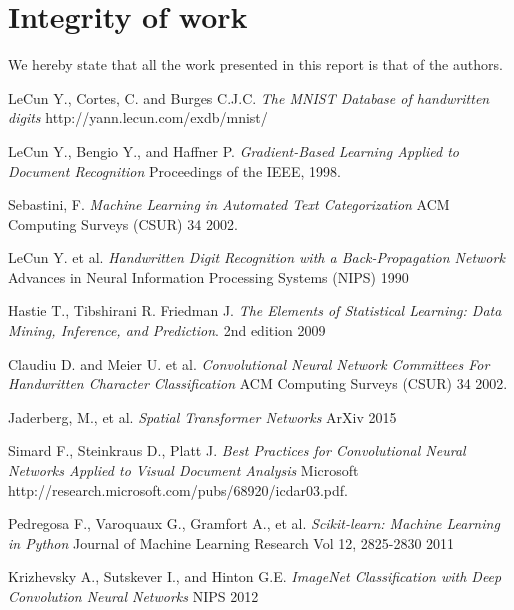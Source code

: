 \documentclass[conference]{IEEEtran}
\begin{document}
\section{Integrity of work}
We hereby state that all the work presented in this report is that of the authors.
\begin{thebibliography}{9}

LeCun Y., Cortes, C. and Burges C.J.C.
	\emph{The MNIST Database of handwritten digits}
	http://yann.lecun.com/exdb/mnist/


LeCun Y., Bengio Y., and Haffner P.
 \emph{Gradient-Based Learning Applied to Document Recognition}
 Proceedings of the IEEE,
 1998.

 
 Sebastini, F.
  \emph{Machine Learning in Automated Text Categorization}
  ACM Computing Surveys (CSUR) 34
  2002.

  LeCun Y. et al.
  \emph{Handwritten Digit Recognition with a Back-Propagation Network}
    Advances in Neural Information Processing Systems (NIPS)
    1990

 Hastie T., Tibshirani R. Friedman J.
 \emph{The Elements of 
Statistical Learning: Data Mining, Inference, and Prediction}.
2nd edition
2009


 Claudiu D. and Meier U. et al.
  \emph{Convolutional Neural Network Committees For Handwritten Character
Classification}
  ACM Computing Surveys (CSUR) 34
  2002.

 Jaderberg, M., et al.
  \emph{Spatial Transformer Networks}
  ArXiv
  2015
  
  Simard F., Steinkraus D., Platt J.
  \emph{Best Practices for Convolutional Neural Networks
Applied to Visual Document Analysis}
	Microsoft
    http://research.microsoft.com/pubs/68920/icdar03.pdf.


Pedregosa F., Varoquaux G., Gramfort A., et al.
\emph{Scikit-learn: Machine Learning in {P}ython}
Journal of Machine Learning Research    
Vol 12, 2825-2830 2011   
       

Krizhevsky A., Sutskever I., and Hinton G.E.
\emph{ImageNet Classification with Deep Convolution Neural Networks}
	NIPS 2012

\end{thebibliography}
\end{document}
